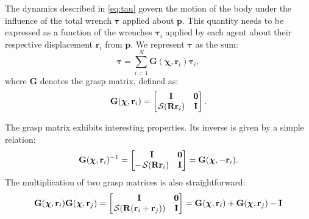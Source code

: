 The dynamics described in \eqref{eq:tau} govern the motion of the body under the influence of the total wrench $\boldsymbol{\tau}$ applied about $\mathbf{p}$. This quantity needs to be expressed as a function of the wrenches $\boldsymbol{\tau}_i$ applied by each agent about their respective displacement $\mathbf{r}_i$ from $\mathbf{p}$. We represent $\boldsymbol{\tau}$ as the sum:
\begin{equation}
    \boldsymbol{\tau} = \sum_{i=1}^N\mathbf{G}(\boldsymbol{\chi}, \mathbf{r}_i)\boldsymbol{\tau}_i, \label{eq:tauNtauIrelation}
\end{equation}
where $\mathbf{G}$ denotes the grasp matrix, defined as:
\begin{equation}
    \mathbf{G}(\boldsymbol{\chi}, \mathbf{r}_i) = \begin{bmatrix}
        \mathbf{I} & \mathbf{0} \\
        \SL[\mathbf{R}\mathbf{r}_i] & \mathbf{I}
    \end{bmatrix}. \label{eq:graspmatrix}
\end{equation}

The grasp matrix exhibits interesting properties. Its inverse is given by a simple relation:
\begin{align}
    \mathbf{G}(\boldsymbol{\chi}, \mathbf{r}_i)^{-1} = \begin{bmatrix}
        \mathbf{I} & \mathbf{0} \\
        -\SL[\mathbf{R}\mathbf{r}_i] & \mathbf{I}
    \end{bmatrix} = \mathbf{G}(\boldsymbol{\chi}, -\mathbf{r}_i).
\end{align}
The multiplication of two grasp matrices is also straightforward:
\begin{align}
    \mathbf{G}(\boldsymbol{\chi}, \mathbf{r}_i)\mathbf{G}(\boldsymbol{\chi}, \mathbf{r}_j) =
    \begin{bmatrix}
        \mathbf{I} & \mathbf{0} \\
        \SL[\mathbf{R}(\mathbf{r}_i + \mathbf{r}_j)] & \mathbf{I}
    \end{bmatrix} = \mathbf{G}(\boldsymbol{\chi}, \mathbf{r}_i) + \mathbf{G}(\boldsymbol{\chi}, \mathbf{r}_j) - \mathbf{I}
\end{align}

